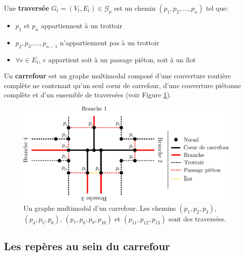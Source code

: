 \begin{definition}
    Une \textbf{traversée} $G_{t} = (V_{t}, E_{t}) \in \mathcal{G}_p$ est un chemin $(p_1, p_2,\dots, p_n)$ tel que:

    \begin{itemize}
        \item $p_1$ et $p_n$ appartiennent à un trottoir
        \item $p_2, p_3, \dots, p_{n-1}$ n'appartiennent pas à un trottoir
        \item $\forall e \in E_t$, $e$ appartient soit à un passage piéton, soit à un îlot
    \end{itemize}
\end{definition}

\begin{definition}
    Un \textbf{carrefour} est un graphe multimodal composé d'une couverture routière complète ne contenant qu'un seul cœur de carrefour, d'une couverture piétonne complète et d'un ensemble de traversées (voir Figure \ref{fig:mod_ex_graphe_carrefour}).
\end{definition}

\begin{figure}[ht]
    \centering
    \includegraphics[width=\textwidth]{images/modelisation/graphe/graphe_multimodal.pdf}
    \caption[Graphe multimodal d'un carrefour]{Un graphe multimodal d'un carrefour. Les chemins $(p_1, p_2, p_3)$, $(p_4, p_5, p_6)$, $(p_7, p_8, p_9, p_{10})$ et $(p_{11}, p_{12}, p_{13})$ sont des traversées.}
    \label{fig:mod_ex_graphe_carrefour}
\end{figure}

\subsection{Les repères au sein du carrefour}

\label{sec:mod_repere_carrefour}

